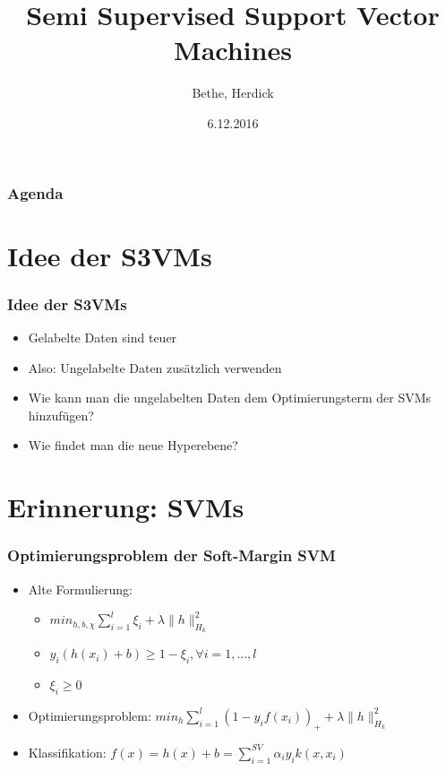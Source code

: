 \documentclass{beamer}
\title{Semi Supervised Support Vector Machines}
\author{Bethe, Herdick}
\date{6.12.2016}
\institute{Classification Algorithms FIN OvGU}
\begin{document}

\newcommand {\framedgraphic}[2] {
    \begin{frame}{#1}
        \begin{center}
            \texttt{[image: \#2]}
        \end{center}
    \end{frame}
}

\begin{frame}[plain]
\titlepage
\end{frame}


\section[Agenda]{}
\begin{frame}
\frametitle{Agenda}
\tableofcontents
\end{frame}

\section{Idee der S3VMs}
\begin{frame}
\frametitle{Idee der S3VMs}
    \begin{itemize}
        \item Gelabelte Daten sind teuer
        \item Also: Ungelabelte Daten zus\"atzlich verwenden
        \item Wie kann man die ungelabelten Daten dem Optimierungsterm der SVMs hinzuf\"ugen?
        \item Wie findet man die neue Hyperebene?
    \end{itemize}
\end{frame}




\section{Erinnerung: SVMs}

\begin{frame}
\frametitle{Optimierungsproblem der Soft-Margin SVM}
    \begin{itemize}
    	\item Alte Formulierung:
    	\begin{itemize}
    		\item $min_{h,b,\chi} \sum_{i=1}^l \xi_i + \lambda \|h\|^2_{H_k}$
    		\item $y_i(h(x_i) + b) \geq 1 - \xi_i, \forall i=1,...,l$
    		\item $\xi_i \geq 0$
    	\end{itemize}
    	\item Optimierungsproblem: $min_h \sum_{i=1}^l (1-y_i f(x_i))_+ + \lambda \|h\|^2_{H_k}$
    	\item Klassifikation: $f(x) = h(x)+b = \sum_{i=1}^{SV} \alpha_i y_i k(x, x_i)$
    \end{itemize} 
\end{frame}
\end{document}
